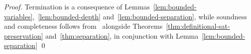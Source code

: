 \begin{proof}
  Termination is a consequence of Lemmas~\ref{lem:bounded-variables},~\ref{lem:bounded-depth} and~\ref{lem:bounded-separation}, while soundness and completeness follows from~\cite{robinson1965} alongside Theorems~\ref{thm:definitional-sat-preservation} and~\ref{thm:separation}, in conjunction with Lemma~\ref{lem:bounded-separation}
  \qed{}
\end{proof}



